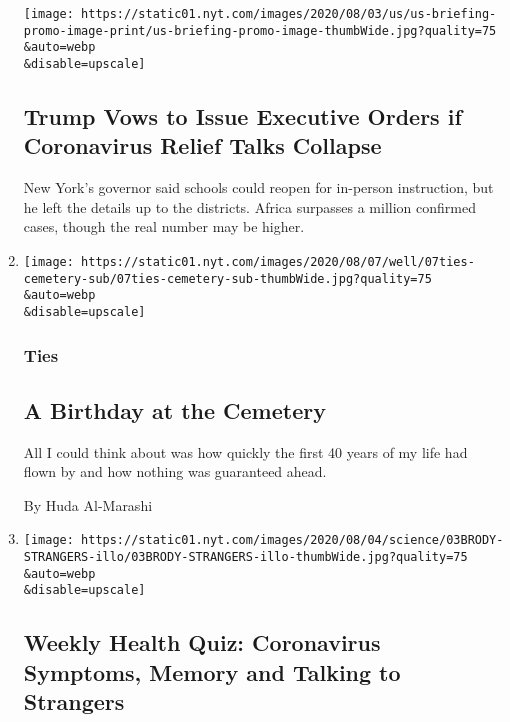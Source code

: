 \begin{enumerate}
  \texttt{[image: https://static01.nyt.com/images/2020/08/03/us/us-briefing-promo-image-print/us-briefing-promo-image-thumbWide.jpg?quality=75\\\&auto=webp\\\&disable=upscale]}

  \hypertarget{trump-vows-to-issue-executive-orders-if-coronavirus-relief-talks-collapse}{%
  \subsection{Trump Vows to Issue Executive Orders if Coronavirus Relief
  Talks
  Collapse}\label{trump-vows-to-issue-executive-orders-if-coronavirus-relief-talks-collapse}}

  New York's governor said schools could reopen for in-person
  instruction, but he left the details up to the districts. Africa
  surpasses a million confirmed cases, though the real number may be
  higher.
\item
  \href{/2020/08/07/well/family/a-birthday-at-the-cemetery.html}{}

  \texttt{[image: https://static01.nyt.com/images/2020/08/07/well/07ties-cemetery-sub/07ties-cemetery-sub-thumbWide.jpg?quality=75\\\&auto=webp\\\&disable=upscale]}

  \hypertarget{ties}{%
  \subsubsection{Ties}\label{ties}}

  \hypertarget{a-birthday-at-the-cemetery}{%
  \subsection{A Birthday at the
  Cemetery}\label{a-birthday-at-the-cemetery}}

  All I could think about was how quickly the first 40 years of my life
  had flown by and how nothing was guaranteed ahead.

  By Huda Al-Marashi
\item
  \href{/interactive/2020/08/07/well/live/07healthquiz-08072020.html}{}

  \texttt{[image: https://static01.nyt.com/images/2020/08/04/science/03BRODY-STRANGERS-illo/03BRODY-STRANGERS-illo-thumbWide.jpg?quality=75\\\&auto=webp\\\&disable=upscale]}

  \hypertarget{weekly-health-quiz-coronavirus-symptoms-memory-and-talking-to-strangers-1}{%
  \subsection{Weekly Health Quiz: Coronavirus Symptoms, Memory and
  Talking to
  Strangers}\label{weekly-health-quiz-coronavirus-symptoms-memory-and-talking-to-strangers-1}}


\end{enumerate}
